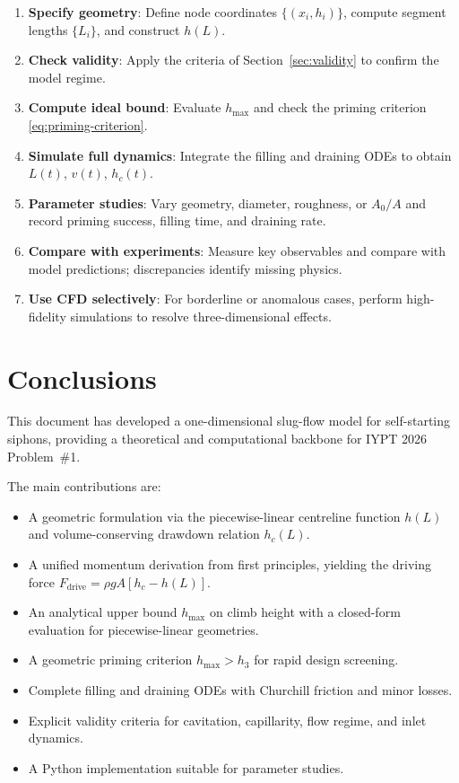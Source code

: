 \documentclass[11pt]{article}
\theoremstyle{definition}
\begin{document}
\begin{enumerate}[nosep]
  \item \textbf{Specify geometry}: Define node coordinates $\{(x_i, h_i)\}$, compute segment 
        lengths $\{L_i\}$, and construct $h(L)$.
  \item \textbf{Check validity}: Apply the criteria of Section~\ref{sec:validity} to confirm 
        the model regime.
  \item \textbf{Compute ideal bound}: Evaluate $h_{\max}$ and check the priming criterion 
        \eqref{eq:priming-criterion}.
  \item \textbf{Simulate full dynamics}: Integrate the filling and draining ODEs to obtain 
        $L(t)$, $v(t)$, $h_c(t)$.
  \item \textbf{Parameter studies}: Vary geometry, diameter, roughness, or $A_0/A$ and record 
        priming success, filling time, and draining rate.
  \item \textbf{Compare with experiments}: Measure key observables and compare with model 
        predictions; discrepancies identify missing physics.
  \item \textbf{Use CFD selectively}: For borderline or anomalous cases, perform 
        high-fidelity simulations to resolve three-dimensional effects.
\end{enumerate}

\section{Conclusions}
\label{sec:conclusions}

This document has developed a one-dimensional slug-flow model for self-starting siphons, 
providing a theoretical and computational backbone for IYPT 2026 Problem~\#1.

The main contributions are:
\begin{itemize}[nosep]
  \item A geometric formulation via the piecewise-linear centreline function $h(L)$ and 
        volume-conserving drawdown relation $h_c(L)$.
  \item A unified momentum derivation from first principles, yielding the driving force 
        $F_{\text{drive}} = \rho g A[h_c - h(L)]$.
  \item An analytical upper bound $h_{\max}$ on climb height with a closed-form evaluation 
        for piecewise-linear geometries.
  \item A geometric priming criterion $h_{\max} > h_3$ for rapid design screening.
  \item Complete filling and draining ODEs with Churchill friction and minor losses.
  \item Explicit validity criteria for cavitation, capillarity, flow regime, and inlet 
        dynamics.
  \item A Python implementation suitable for parameter studies.
\end{itemize}
\end{document}
